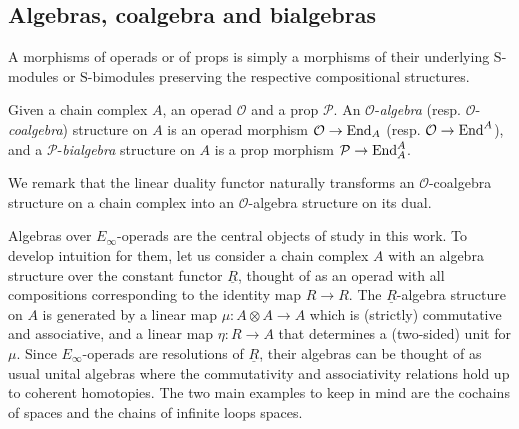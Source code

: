 \subsection{Algebras, coalgebra and bialgebras}

A morphisms of operads or of props is simply a morphisms of their underlying $\mathrm{S}$-modules or $\mathrm{S}$-bimodules preserving the respective compositional structures.

Given a chain complex $A$, an operad $\mathcal O$ and a prop $\mathcal P$.
An $\mathcal O$-\textit{algebra} (resp. $\mathcal O$-\textit{coalgebra}) structure on $A$ is an operad morphism $\mathcal O \to \mathrm{End}_A$ (resp. $\mathcal O \to \mathrm{End}^A$), and a $\mathcal P$-\textit{bialgebra} structure on $A$ is a prop morphism $\mathcal P \to \mathrm{End}_A^A$.

We remark that the linear duality functor naturally transforms an $\mathcal O$-coalgebra structure on a chain complex into an $\mathcal O$-algebra structure on its dual.

Algebras over $E_\infty$-operads are the central objects of study in this work.
To develop intuition for them, let us consider a chain complex $A$ with an algebra structure over the constant functor $\underline{R}$, thought of as an operad with all compositions corresponding to the identity map $R \to R$.
The $\underline{R}$-algebra structure on $A$ is generated by a linear map $\mu \colon A \otimes A \to A$ which is (strictly) commutative and associative, and a linear map $\eta \colon R \to A$ that determines a (two-sided) unit for $\mu$.
Since $E_\infty$-operads are resolutions of $\underline{R}$, their algebras can be thought of as usual unital algebras where the commutativity and associativity relations hold up to coherent homotopies.
The two main examples to keep in mind are the cochains of spaces and the chains of infinite loops spaces.
